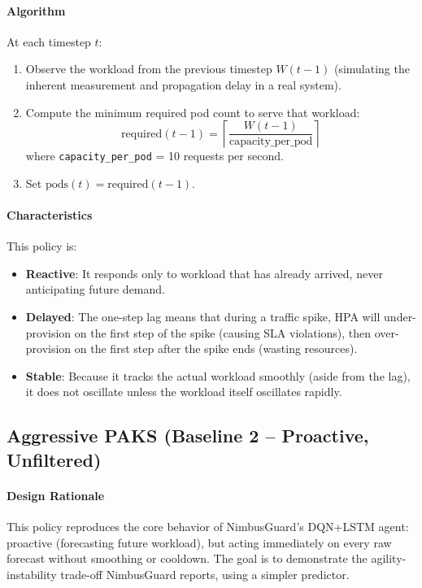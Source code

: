 \paragraph{Algorithm} At each timestep $t$:
\begin{enumerate}
  \item Observe the workload from the previous timestep $W(t-1)$ (simulating the inherent measurement and propagation delay in a real system).
  \item Compute the minimum required pod count to serve that workload:
  \[
  \text{required}(t-1) = \left\lceil \frac{W(t-1)}{\text{capacity\_per\_pod}} \right\rceil
  \]
  where \texttt{capacity\_per\_pod} = 10 requests per second.
  \item Set $\text{pods}(t) = \text{required}(t-1)$.
\end{enumerate}

\paragraph{Characteristics} This policy is:
\begin{itemize}
  \item \textbf{Reactive}: It responds only to workload that has already arrived, never anticipating future demand.
  \item \textbf{Delayed}: The one-step lag means that during a traffic spike, HPA will under-provision on the first step of the spike (causing SLA violations), then over-provision on the first step after the spike ends (wasting resources).
  \item \textbf{Stable}: Because it tracks the actual workload smoothly (aside from the lag), it does not oscillate unless the workload itself oscillates rapidly.
\end{itemize}

\subsection{Aggressive PAKS (Baseline 2 -- Proactive, Unfiltered)}

\paragraph{Design Rationale} This policy reproduces the core behavior of NimbusGuard's DQN+LSTM agent: proactive (forecasting future workload), but acting immediately on every raw forecast without smoothing or cooldown. The goal is to demonstrate the agility-instability trade-off NimbusGuard reports, using a simpler predictor.

